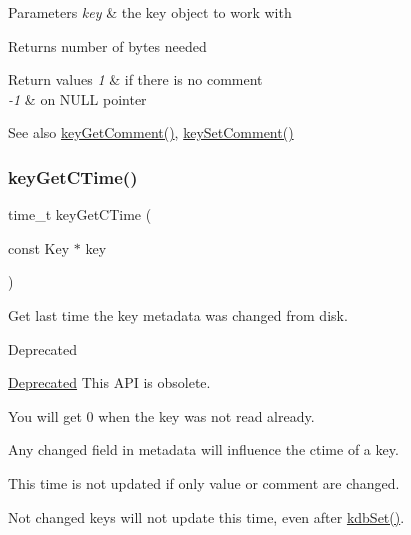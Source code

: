 \begin{DoxyParams}{Parameters}
{\em key} & the key object to work with \\
\hline
\end{DoxyParams}
\begin{DoxyReturn}{Returns}
number of bytes needed 
\end{DoxyReturn}

\begin{DoxyRetVals}{Return values}
{\em 1} & if there is no comment \\
\hline
{\em -\/1} & on N\+U\+LL pointer \\
\hline
\end{DoxyRetVals}
\begin{DoxySeeAlso}{See also}
\mbox{\hyperlink{group__meta_gafb89735689929ff717cc9f2d0d0b46a2}{key\+Get\+Comment()}}, \mbox{\hyperlink{group__meta_ga8863a877a84fa46e6017fe72e49b89c1}{key\+Set\+Comment()}} 
\end{DoxySeeAlso}
\mbox{\label{group__meta_ga2c213c120cbe02201278ef7fb8cd94be}} 
\subsubsection{\texorpdfstring{keyGetCTime()}{keyGetCTime()}}
{\footnotesize\ttfamily time\+\_\+t key\+Get\+C\+Time (\begin{DoxyParamCaption}\item[{const Key $\ast$}]{key }\end{DoxyParamCaption})}



Get last time the key metadata was changed from disk. 

\begin{DoxyRefDesc}{Deprecated}
\item[\mbox{\hyperlink{deprecated__deprecated000025}{Deprecated}}]This A\+PI is obsolete.\end{DoxyRefDesc}


You will get 0 when the key was not read already.

Any changed field in metadata will influence the ctime of a key.

This time is not updated if only value or comment are changed.

Not changed keys will not update this time, even after \mbox{\hyperlink{group__kdb_ga11436b058408f83d303ca5e996832bcf}{kdb\+Set()}}.

